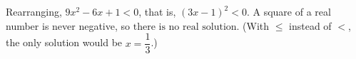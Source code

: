 Rearranging, $9x^2-6x+1<0$, that is, $(3x-1)^2<0$. A square of a real number is never negative, so $\boxed{\text{there is no real solution}}$. (With $\le$ instead of $<$, the only solution would be $x=\dfrac{1}{3}$.)
